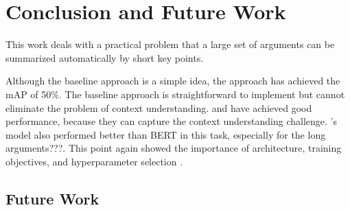 \section{Conclusion and Future Work}\label{conclusion}


This work deals with a practical problem that a large set of arguments can be summarized automatically by short key points.

Although the baseline approach is a simple idea, the approach has achieved the mAP of 50\%. 
The baseline approach is straightforward to implement but cannot eliminate the problem of context understanding. 
\Roberta and \Bert have achieved good performance, because they can capture the context understanding challenge. 
\Roberta 's model also performed better than BERT in this task, especially for the long arguments???. This point again showed the importance of architecture, training objectives, and hyperparameter selection .
\subsection{Future Work}

